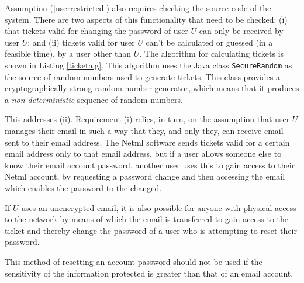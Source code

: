 Assumption (\ref{userrestricted}) also requires checking the source code of the system. There are two aspects of this functionality that need to be checked: (i) that tickets valid for changing the password of user $U$ can only be received by user $U$; and (ii) tickets valid for user $U$ can't be calculated or guessed (in a feasible time), by a user other than $U$. The algorithm for calculating tickets is shown in Listing \ref{ticketalg}. This algorithm uses the Java class \verb|SecureRandom| as the source of random numbers used to generate tickets. This class provides a cryptographically strong random number generator\iflonger \cite{SecureRandomJavadoc},\else,\fi which means that it produces 
a {\em non-deterministic} sequence of random numbers.

This addresses (ii). Requirement (i) relies, in turn, on the assumption that user $U$ manages their email in such a way that they, and only they, can receive email sent to their email address. The Netml software sends tickets valid for a certain email address only to that email address, but if a user allows someone else to know their email account password, another user uses this to gain access to their Netml account, by requesting a password change and then accessing the email which enables the password to the changed.

If $U$ uses an unencrypted email, it is also possible for anyone with physical access to the network by means of which the email is transferred to gain access to the ticket and thereby change the password of a user who is attempting to reset their password.

This method of resetting an account password should not be used if the sensitivity of the information protected is greater than that of an email account.

